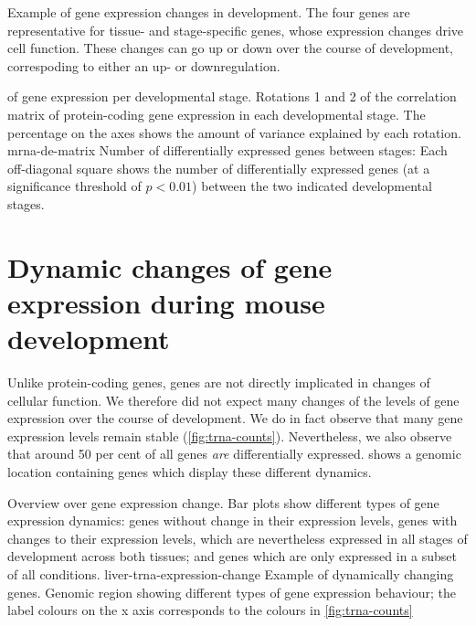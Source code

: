     {Example of gene expression changes in development.}
    {The four genes are representative for tissue- and stage-specific genes,
    whose expression changes drive cell function. These changes can go up or
    down over the course of development, correspoding to either an up- or
    downregulation.}

    {\pca of \mrna gene expression per developmental stage.}
    {Rotations \num{1} and \num{2} of the correlation matrix of
    protein-coding gene expression in each developmental stage. The percentage
    on the axes shows the amount of variance explained by each rotation.}
    {mrna-de-matrix}
    {Number of differentially expressed \mrna genes between stages:}
    {Each off-diagonal square shows the number of differentially
    expressed genes (at a significance threshold of \(p<0.01\)) between
    the two indicated developmental stages.}

\section{Dynamic changes of \trna gene expression during mouse development}

Unlike protein-coding genes, \trna genes are not directly implicated in changes
of cellular function. We therefore did not expect many changes of the levels of
\trna gene expression over the course of development. We do in fact observe that
many \trna gene expression levels remain stable (\cref{fig:trna-counts}).
Nevertheless, we also observe that around \num{50} per cent of all \trna genes
\emph{are} differentially expressed. 
shows a genomic location containing \trna genes which display these different
dynamics.

    {Overview over \trna gene expression change.}
    {Bar plots show different types of \trna gene expression dynamics: \trna
    genes without change in their expression levels, \trna genes with changes to
    their expression levels, which are nevertheless expressed in all stages of
    development across both tissues; and \trna genes which are only expressed in
    a subset of all conditions.}
    {liver-trna-expression-change}
    {Example of dynamically changing \trna genes.}
    {Genomic region showing different types of \trna gene expression behaviour;
    the label colours on the x axis corresponds to the colours in
    \cref{fig:trna-counts}}

